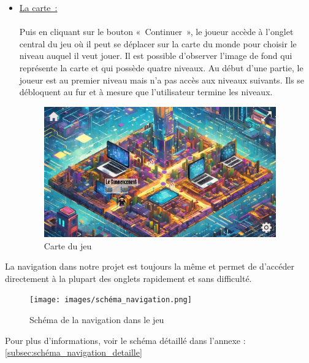 \documentclass[12pt,a4paper]{article}
\begin{document}
\begin{itemize}
                \item \tabto{1cm} \underline{La carte~:}\\\\
                \tabto{1cm} Puis en cliquant sur le bouton «~Continuer~», le joueur accède à l’onglet central du jeu où il peut se déplacer sur la carte du monde pour choisir le niveau auquel il veut jouer. Il est possible d'observer l’image de fond qui représente la carte et qui possède quatre niveaux. Au début d’une partie, le joueur est au premier niveau mais n’a pas accès aux niveaux suivants. Ils se débloquent au fur et à mesure que l’utilisateur termine les niveaux.\\

                \begin{figure}[h]
                    \centering
                    \includegraphics[width=10cm]{images/carte.png}
                    \caption{Carte du jeu}
                \end{figure}
                
            \end{itemize}

            \tabto{1cm} La navigation dans notre projet est toujours la même et permet de d'accéder directement à la plupart des onglets rapidement et sans difficulté.\\

            \begin{figure}[h]
                \centering
                \texttt{[image: images/schéma\_navigation.png]}
                \caption{Schéma de la navigation dans le jeu}
            \end{figure}

            Pour plus d'informations, voir le schéma détaillé dans l'annexe : \ref{subsec:schéma_navigation_detaille}\\
\end{document}
